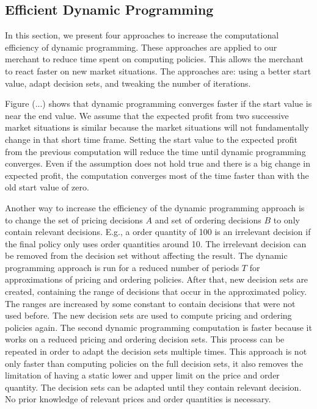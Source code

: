 
\subsection{Efficient Dynamic Programming}
\label{section:faster_dyn_prog}
In this section, we present four approaches to increase the computational efficiency of dynamic programming.
These approaches are applied to our merchant to reduce time spent on computing policies.
This allows the merchant to react faster on new market situations.
The approaches are: using a better start value, adapt decision sets, and tweaking the number of iterations.

Figure (...) shows that dynamic programming converges faster if the start value is near the end value.
We assume that the expected profit from two successive market situations is similar because the market situations will not fundamentally change in that short time frame.
Setting the start value to the expected profit from the previous computation will reduce the time until dynamic programming converges.
Even if the assumption does not hold true and there is a big change in expected profit, the computation converges most of the time faster than with the old start value of zero.

Another way to increase the efficiency of the dynamic programming approach is to change the set of pricing decisions $A$ and set of ordering decisions $B$ to only contain relevant decisions.
E.g., a order quantity of 100 is an irrelevant decision if the final policy only uses order quantities around 10.
The irrelevant decision can be removed from the decision set without affecting the result.
The dynamic programming approach is run for a reduced number of periods $T$ for approximations of pricing and ordering policies.
After that, new decision sets are created, containing the range of decisions that occur in the approximated policy.
The ranges are increased by some constant to contain decisions that were not used before.
The new decision sets are used to compute pricing and ordering policies again.
The second dynamic programming computation is faster because it works on a reduced pricing and ordering decision sets.
This process can be repeated in order to adapt the decision sets multiple times.
This approach is not only faster than computing policies on the full decision sets, it also removes the limitation of having a static lower and upper limit on the price and order quantity.
The decision sets can be adapted until they contain relevant decision.
No prior knowledge of relevant prices and order quantities is necessary.


